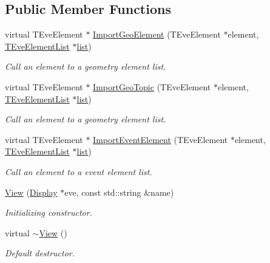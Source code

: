 \subsection*{Public Member Functions}
\begin{DoxyCompactItemize}
\item 
virtual TEveElement $\ast$ \hyperlink{class_d_d4hep_1_1_view_adc25ba7ece97c2f7c69f8fa6e0c13088}{ImportGeoElement} (TEveElement $\ast$element, \hyperlink{class_t_eve_element_list}{TEveElementList} $\ast$\hyperlink{classstd_1_1list}{list})
\begin{DoxyCompactList}\small\item\em Call an element to a geometry element list. \item\end{DoxyCompactList}\item 
virtual TEveElement $\ast$ \hyperlink{class_d_d4hep_1_1_view_a413a1148e0fb6d3007c971e9f1266629}{ImportGeoTopic} (TEveElement $\ast$element, \hyperlink{class_t_eve_element_list}{TEveElementList} $\ast$\hyperlink{classstd_1_1list}{list})
\begin{DoxyCompactList}\small\item\em Call an element to a geometry element list. \item\end{DoxyCompactList}\item 
virtual TEveElement $\ast$ \hyperlink{class_d_d4hep_1_1_view_acd696f9f50bda0d632cec822ab1f4672}{ImportEventElement} (TEveElement $\ast$element, \hyperlink{class_t_eve_element_list}{TEveElementList} $\ast$\hyperlink{classstd_1_1list}{list})
\begin{DoxyCompactList}\small\item\em Call an element to a event element list. \item\end{DoxyCompactList}\item 
\hyperlink{class_d_d4hep_1_1_view_a4272d52c420ccef43e18da8915451bcd}{View} (\hyperlink{class_d_d4hep_1_1_display}{Display} $\ast$eve, const std::string \&name)
\begin{DoxyCompactList}\small\item\em Initializing constructor. \item\end{DoxyCompactList}\item 
virtual \hyperlink{class_d_d4hep_1_1_view_ad0dc854db9aabbea98a334dec89f785c}{$\sim$View} ()
\begin{DoxyCompactList}\small\item\em Default destructor. \item\end{DoxyCompactList}\item 

\end{DoxyCompactItemize}
